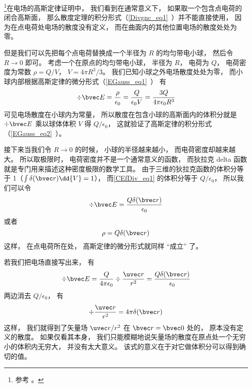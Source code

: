 

\footnote{参考 \cite{GriffE}。}在电场的高斯定律证明中， 我们看到在通常意义下， 如果取一个包含点电荷的闭合高斯面， 那么散度定理的积分形式（\autoref{Divgnc_eq1}~）并不能直接使用， 因为在点电荷处电场的散度没有定义， 而在曲面内的其他位置电场的散度处处为零。

但是我们可以先把每个点电荷替换成一个半径为 $R$ 的均匀带电小球， 然后令 $R\to 0$ 即可。 考虑一个在原点的均匀带电小球， 半径为 $R$， 电荷为 $Q$， 电荷密度为常数 $\rho = Q/V$， $V = 4\pi R^3/3$。 我们已知小球之外电场散度处处为零， 而小球内部根据高斯定律的微分形式（\autoref{EGauss_eq1}~） 有
\begin{equation}\label{CEfDiv_eq1}
\div \bvec E = \frac{\rho}{\epsilon_0} = \frac{Q}{\epsilon_0 V} = \frac{3Q}{4\pi \epsilon_0 R^3}
\end{equation}
可见电场散度在小球内为常量， 所以散度在包含小球的高斯面内的体积分就是 $\div \bvec E$ 乘以球体体积 $V$ 得 $Q/\epsilon_0$， 这就验证了高斯定律的积分形式（\autoref{EGauss_eq2}~）。

接下来当我们令 $R\to 0$ 的时候， 小球的半径越来越小， 而电荷密度却越来越大。 所以取极限时， 电荷密度并不是一个通常意义的函数， 而狄拉克 delta 函数就是专门用来描述这种密度极限的数学工具。 由于三维的狄拉克函数的体积分等于 1（$\int \delta(\bvec r)\dd{V} = 1$）， 而\autoref{CEfDiv_eq1} 的体积分等于 $Q/\epsilon_0$， 所以我们可以令
\begin{equation}
\div \bvec E = \frac{Q\delta(\bvec r)}{\epsilon_0}
\end{equation}
或者
\begin{equation}
\rho = Q\delta(\bvec r)
\end{equation}
这样， 在点电荷所在处， 高斯定律的微分形式就同样 “成立” 了。

若我们把电场直接写出来， 有
\begin{equation}
\div \bvec E = \frac{Q}{4\pi\epsilon_0}\div \frac{\uvec r}{r^2} = \frac{Q\delta(\bvec r)}{\epsilon_0}
\end{equation}
两边消去 $Q/\epsilon_0$， 有
\begin{equation}\label{CEfDiv_eq2}
\div \frac{\uvec r}{r^2} = 4\pi\delta(\bvec r)
\end{equation}
这样， 我们就得到了矢量场 ${\uvec r}/{r^2}$ 在 $\bvec r = \bvec 0$ 处的， 原本没有定义的散度。 如果仅看其本身， 我们只能模糊地说矢量场的散度在原点处一个无穷小的体积内无穷大， 并没有太大意义。 该式的意义在于对它做体积分可以得到确切的值。
